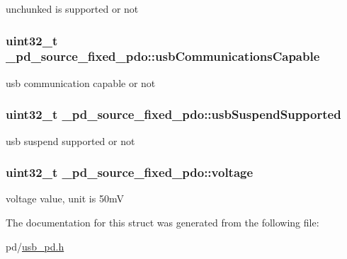 unchunked is supported or not \hypertarget{struct__pd__source__fixed__pdo_a0e2f3fc73e269168132defedb85f9d9f}{
\subsubsection[{usb\-Communications\-Capable}]{\setlength{\rightskip}{0pt plus 5cm}uint32\-\_\-t \-\_\-pd\-\_\-source\-\_\-fixed\-\_\-pdo\-::usb\-Communications\-Capable}}\label{struct__pd__source__fixed__pdo_a0e2f3fc73e269168132defedb85f9d9f}
usb communication capable or not \hypertarget{struct__pd__source__fixed__pdo_aa836f41dcaaafe17d4ff65eeb3729b6d}{
\subsubsection[{usb\-Suspend\-Supported}]{\setlength{\rightskip}{0pt plus 5cm}uint32\-\_\-t \-\_\-pd\-\_\-source\-\_\-fixed\-\_\-pdo\-::usb\-Suspend\-Supported}}\label{struct__pd__source__fixed__pdo_aa836f41dcaaafe17d4ff65eeb3729b6d}
usb suspend supported or not \hypertarget{struct__pd__source__fixed__pdo_abba8fe6a9f4c4f6ac33cbfe075945e6a}{
\subsubsection[{voltage}]{\setlength{\rightskip}{0pt plus 5cm}uint32\-\_\-t \-\_\-pd\-\_\-source\-\_\-fixed\-\_\-pdo\-::voltage}}\label{struct__pd__source__fixed__pdo_abba8fe6a9f4c4f6ac33cbfe075945e6a}
voltage value, unit is 50m\-V 

The documentation for this struct was generated from the following file\-:\begin{DoxyCompactItemize}
\item 
pd/\hyperlink{usb__pd_8h}{usb\-\_\-pd.\-h}\end{DoxyCompactItemize}
